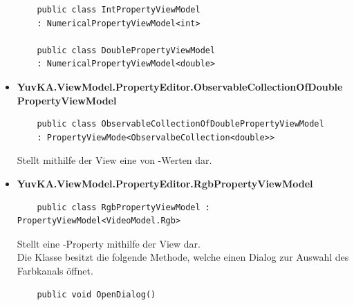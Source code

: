\begin{itemize}
	\begin{verbatim}
	public class IntPropertyViewModel 
	: NumericalPropertyViewModel<int>
	
	public class DoublePropertyViewModel 
	: NumericalPropertyViewModel<double>
	\end{verbatim}				

\item{\textbf{YuvKA.ViewModel.PropertyEditor.ObservableCollectionOfDoublePropertyViewModel\\}}
	\begin{verbatim}
	public class ObservableCollectionOfDoublePropertyViewModel 
	: PropertyViewMode<ObservalbeCollection<double>>
	\end{verbatim}
	Stellt mithilfe der View eine  von -Werten dar.

\item{\textbf{YuvKA.ViewModel.PropertyEditor.RgbPropertyViewModel\\}}
	\begin{verbatim}
	public class RgbPropertyViewModel : PropertyViewModel<VideoModel.Rgb>
	\end{verbatim}	
	Stellt eine -Property mithilfe der View dar.\\
	Die Klasse besitzt die folgende Methode, welche einen Dialog zur Auswahl des Farbkanals öffnet.
	\begin{verbatim}
	public void OpenDialog()
	\end{verbatim}

\end{itemize}


